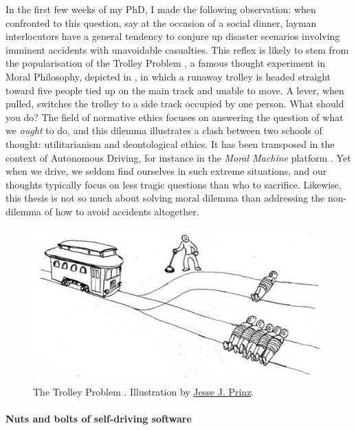 In the first few weeks of my PhD, I made the following observation: when confronted to this question, say at the occasion of a social dinner, layman interlocutors have a general tendency to conjure up disaster scenarios involving imminent accidents with unavoidable casualties. 
This reflex is likely to stem from the popularisation of the Trolley Problem \citep{Foot1967}, a famous thought experiment in Moral Philosophy, depicted in , in which a runaway trolley is headed straight toward five people tied up on the main track and unable to move. A lever, when pulled, switches the trolley to a side track occupied by one person. What should you do? The field of normative ethics focuses on answering the question of what we \emph{ought} to do, and this dilemma illustrates a clash between two schools of thought: utilitarianism and deontological ethics. 
It has been transposed in the context of Autonomous Driving, for instance in the \emph{Moral Machine} platform \citep{Awad2018}.
Yet when we drive, we seldom find ourselves in such extreme situations, and our thoughts typically focus on less tragic questions than who to sacrifice.
Likewise, this thesis is not so much about solving moral dilemma than addressing the non-dilemma of how to avoid accidents altogether.%
\begin{figure}[tp]
	\centering
	\includegraphics[width=0.7\linewidth]{img/trolley}
	\caption{The Trolley Problem \citep{Foot1967}. Illustration by \href{http://subcortex.com/}{Jesse J. Prinz}.}
	\label{fig:trolley}
\end{figure}

\paragraph{Nuts and bolts of self-driving software}

